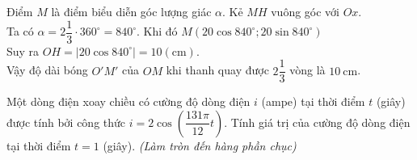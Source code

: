 \begin{ex}
{\begin{center}
		\end{center}
		Điểm $M$ là điểm biểu diễn góc lượng giác $\alpha $. Kẻ $MH$ vuông góc với $Ox$.\\
		Ta có $\alpha =2\dfrac{1}{3}\cdot 360^\circ =840^\circ $. Khi đó $M\left(20\cos 840^\circ;20\sin 840^\circ\right)$\\
		Suy ra $OH=\left| 20\cos 840^\circ\right|=10\left(\mathrm{cm}\right)$.\\ Vậy độ dài bóng $O'M'$ của $OM$ khi thanh quay được $2\dfrac{1}{3}$ vòng là $10 ~\mathrm{cm}$.
	}
\end{ex}

\begin{ex}%
	Một dòng điện xoay chiều có cường độ dòng điện $i$ (ampe) tại thời điểm $t$ (giây) được tính bởi công thức $i=2\cos\left(\dfrac{131\pi}{12}t\right)$. Tính giá trị của cường độ dòng điện tại thời điểm  $t=1$ (giây). \textit{(Làm tròn đến hàng phần chục)} 
	
\end{ex}

